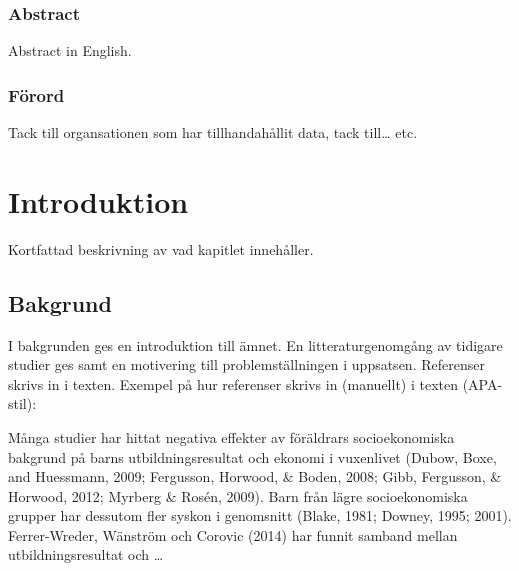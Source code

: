 \documentclass[10pt,swedish]{book}
\begin{document}
\cleardoublepage{}


\subsection*{Abstract}

Abstract in English.

\cleardoublepage{}


\subsection*{Förord}

Tack till organsationen som har tillhandahållit data, tack till\dots{}
etc.

\cleardoublepage{}

\tableofcontents{}

\cleardoublepage{}

\listoffigures

\cleardoublepage{}

\listoftables

\cleardoublepage{}

\mainmatter

\chapter{Introduktion}

Kortfattad beskrivning av vad kapitlet innehåller.

\section{Bakgrund}

I bakgrunden ges en introduktion till ämnet. En litteraturgenomgång
av tidigare studier ges samt en motivering till problemställningen
i uppsatsen. Referenser skrivs in i texten. Exempel på hur referenser
skrivs in (manuellt) i texten (APA-stil):

Många studier har hittat negativa effekter av föräldrars socioekonomiska
bakgrund på barns utbildningsresultat och ekonomi i vuxenlivet (Dubow,
Boxe, and Huessmann, 2009; Fergusson, Horwood, \& Boden, 2008; Gibb,
Fergusson, \& Horwood, 2012; Myrberg \& Rosén, 2009). Barn från lägre
socioekonomiska grupper har dessutom fler syskon i genomsnitt (Blake,
1981; Downey, 1995; 2001). Ferrer-Wreder, Wänström och Corovic (2014)
har funnit samband mellan utbildningsresultat och \dots{} 
\end{document}
